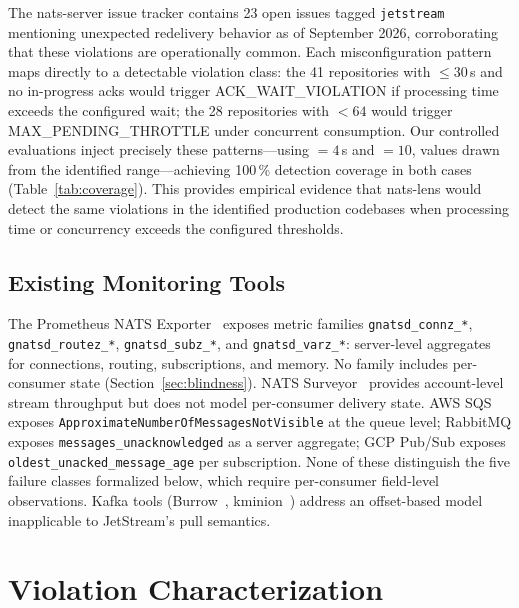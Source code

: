 \documentclass[journal]{IEEEtran}
\begin{document}
The nats-server issue tracker contains 23 open issues tagged
\texttt{jetstream} mentioning unexpected redelivery behavior as of September
2026, corroborating that these violations are operationally common.
Each misconfiguration pattern maps directly to a detectable violation class:
the 41 repositories with ${}\leq 30$\,s and no in-progress
acks would trigger ACK\_WAIT\_VIOLATION if processing time exceeds the
configured wait; the 28 repositories with ${}<64$
would trigger MAX\_PENDING\_THROTTLE under concurrent consumption.
Our controlled evaluations inject precisely these patterns---using
${=}4$\,s and ${=}10$, values
drawn from the identified range---achieving 100\,\% detection coverage
in both cases (Table~\ref{tab:coverage}).
This provides empirical evidence that nats-lens would detect the same
violations in the identified production codebases when processing time
or concurrency exceeds the configured thresholds.

\subsection{Existing Monitoring Tools}

The Prometheus NATS Exporter~\cite{prometheus-nats} exposes metric
families \texttt{gnatsd\_connz\_*}, \texttt{gnatsd\_routez\_*},
\texttt{gnatsd\_subz\_*}, and \texttt{gnatsd\_varz\_*}: server-level
aggregates for connections, routing, subscriptions, and memory.
No family includes per-consumer state (Section~\ref{sec:blindness}).
NATS Surveyor~\cite{surveyor} provides account-level stream throughput
but does not model per-consumer delivery state. AWS SQS exposes
\texttt{ApproximateNumberOfMessagesNotVisible} at the queue level;
RabbitMQ exposes \texttt{messages\_unacknowledged} as a server aggregate;
GCP Pub/Sub exposes \texttt{oldest\_unacked\_message\_age} per
subscription. None of these distinguish the five failure classes
formalized below, which require per-consumer field-level observations.
Kafka tools (Burrow~\cite{burrow}, kminion~\cite{kminion}) address an
offset-based model inapplicable to JetStream's pull semantics.

\section{Violation Characterization}
\label{sec:violations}
\end{document}
